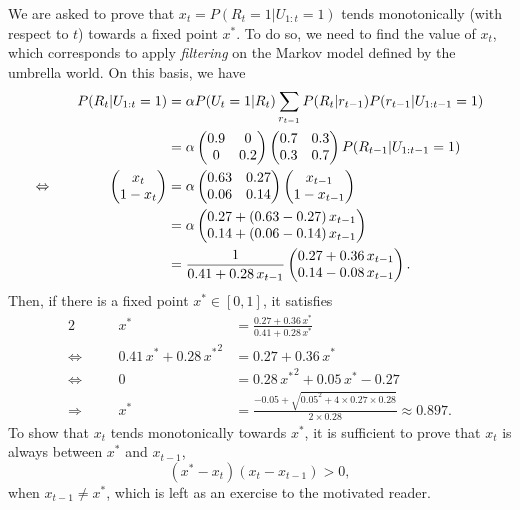 \documentclass[11pt, a4paper]{article}
\begin{document}
\begin{enumerate}
    \begin{solution}
        We are asked to prove that $x_t = P(R_t = 1 | U_{1:t} = 1)$ tends monotonically (with respect to $t$) towards a fixed point $x^*$. To do so, we need to find the value of $x_t$, which corresponds to apply \emph{filtering} on the Markov model defined by the umbrella world. On this basis, we have
        \begin{alignat*}{2}
            && P(R_t | U_{1:t} = 1) & = \alpha P(U_t = 1 | R_t) \sum_{r_{t-1}} P(R_t | r_{t-1}) P(r_{t-1} | U_{1:t-1}  = 1) \\
            &&& = \alpha \begin{pmatrix}0.9 & 0 \\ 0 & 0.2\end{pmatrix} \begin{pmatrix}0.7 & 0.3 \\ 0.3 & 0.7\end{pmatrix} P(R_{t-1} | U_{1:t-1} = 1) \\
            \Leftrightarrow \quad && \begin{pmatrix}x_{t} \\ 1 - x_{t}\end{pmatrix} & = \alpha \begin{pmatrix}0.63 & 0.27 \\ 0.06 & 0.14\end{pmatrix} \begin{pmatrix}x_{t-1} \\ 1 - x_{t-1}\end{pmatrix} \\
            &&& = \alpha \begin{pmatrix}0.27 + (0.63 - 0.27) \, x_{t-1} \\ 0.14 + (0.06 - 0.14) \, x_{t-1}\end{pmatrix} \\
            &&& = \frac{1}{0.41 + 0.28 \, x_{t-1}} \begin{pmatrix}0.27 + 0.36 \, x_{t-1} \\ 0.14 - 0.08 \, x_{t-1}\end{pmatrix} .
        \end{alignat*}
        Then, if there is a fixed point $x^* \in [0, 1]$, it satisfies
        \begin{alignat*}{2}
            && x^* & = \frac{0.27 + 0.36 \, x^*}{0.41 + 0.28 \, x^*} \\
            \Leftrightarrow \quad && 0.41 \, x^* + 0.28 \, {x^*}^2 & = 0.27 + 0.36 \, x^* \\
            \Leftrightarrow \quad && 0 & = 0.28 \, {x^*}^2 + 0.05 \, x^* - 0.27 \\
            \Rightarrow \quad && x^* & = \frac{-0.05 + \sqrt{0.05^2 + 4 \times 0.27 \times 0.28}}{2 \times 0.28} \approx \num{0.897} .
        \end{alignat*}
        To show that $x_t$ tends monotonically towards $x^*$, it is sufficient to prove that $x_t$ is always between $x^*$ and $x_{t-1}$, \ie{}
        \begin{equation*}
            (x^* - x_t) (x_t - x_{t-1}) > 0,
        \end{equation*}
        when $x_{t-1} \neq x^*$, which is left as an exercise to the motivated reader.
    \end{solution}


\end{enumerate}
\end{document}
